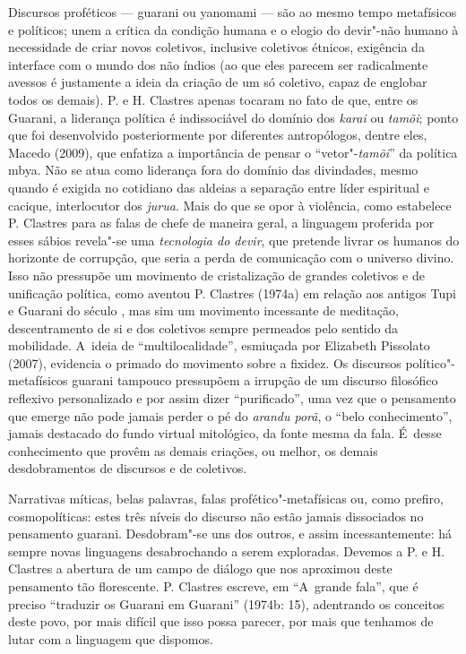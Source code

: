 Discursos proféticos --- guarani ou yanomami --- são ao mesmo tempo
metafísicos e políticos; unem a crítica da condição humana e o elogio
do devir"-não humano à necessidade de criar novos coletivos, inclusive
coletivos étnicos, exigência da interface com o mundo dos não índios
(ao que eles parecem ser radicalmente avessos é justamente a ideia da
criação de um só coletivo, capaz de englobar todos os demais). P. e H.
Clastres apenas tocaram no fato de que, entre os Guarani, a liderança
política é indissociável do domínio dos \emph{karai} ou \emph{tamõi}; ponto que foi
desenvolvido posteriormente por diferentes antropólogos, dentre eles,
Macedo (2009), que enfatiza a importância de pensar o ``vetor"-\emph{tamõi}'' da
política mbya. Não se atua como liderança fora do domínio das
divindades, mesmo quando é exigida no cotidiano das aldeias a separação
entre líder espiritual e cacique, interlocutor dos \emph{jurua}. Mais do que
se opor à violência, como estabelece P. Clastres para as falas de chefe
de maneira geral, a linguagem proferida por esses sábios revela"-se uma
\emph{tecnologia do devir}, que pretende livrar os humanos do horizonte de
corrupção, que seria a perda de comunicação com o universo divino. Isso
não pressupõe um movimento de cristalização de grandes coletivos e de
unificação política, como aventou P. Clastres (1974a) em relação aos
antigos Tupi e Guarani do século , mas sim um movimento incessante
de meditação, descentramento de si e dos coletivos sempre permeados
pelo sentido da mobilidade. A~ideia de ``multilocalidade'', esmiuçada por
Elizabeth Pissolato (2007), evidencia o primado do movimento sobre a
fixidez. Os discursos político"-metafísicos guarani tampouco pressupõem
a irrupção de um discurso filosófico reflexivo personalizado e por
assim dizer ``purificado'', uma vez que o pensamento que emerge não pode
jamais perder o pé do \emph{arandu porã}, o ``belo conhecimento'', jamais
destacado do fundo virtual mitológico, da fonte mesma da fala. É~desse
conhecimento que provêm as demais criações, ou melhor, os demais
desdobramentos de discursos e de coletivos.

Narrativas míticas, belas palavras, falas profético"-metafísicas ou, como
prefiro, cosmopolíticas: estes três níveis do discurso não estão jamais
dissociados no pensamento guarani. Desdobram"-se uns dos outros, e assim
incessantemente: há sempre novas linguagens desabrochando a serem
exploradas. Devemos a P. e H. Clastres a abertura de um campo de
diálogo que nos aproximou deste pensamento tão florescente. P. Clastres
escreve, em ``A~grande fala'', que é preciso ``traduzir os Guarani em
Guarani'' (1974b: 15), adentrando os conceitos deste povo, por mais
difícil que isso possa parecer, por mais que tenhamos de lutar com a
linguagem que dispomos.

